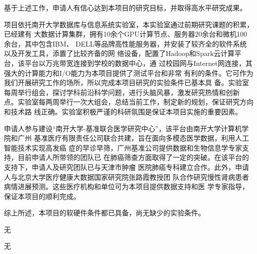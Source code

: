 \documentclass[a4paper,zihao=-4]{article}
\begin{document}
基于上述工作，申请人有信心达到本项目的研究目标，并取得高水平研究成果。


项目依托南开大学数据库与信息系统实验室，本实验室通过前期研究课题的积累，已经建有
大数据计算集群，拥有10余个GPU计算节点、服务器20余台和微机100余台，其中包含IBM、
DELL等品牌高性能服务器，并安装了较齐全的软件系统以及开发工具，添置了比较齐备的网
络设备，配置了Hadoop和Spark云计算平台，该平台以万兆带宽连接到学校的数据中心，通
过校园网与Internet网连接，其强大的计算能力和I/O能力为本项目提供了测试平台和非常
有利的条件。它可作为我们开展研究工作的场所，所以完成本项目研究的实验条件已基本具
备。实验室每周举行组会，探讨学科前沿科学问题，进行头脑风暴，激发研究热情和创新
点。实验室每两周举行一次大组会，总结当前工作，制定新的规划，保证研究方向和技术路
线正确。实验室积极严谨的科研氛围是保证本项目实施的重要因素。

申请人参与建设“南开大学-基准联合医学研究中心”，该平台由南开大学计算机学院和广州
基准医疗有限责任公司联合共建，旨在面向多模态医学数据，利用人工智能技术实现高发癌
症的早诊早筛，广州基准公司提供数据和生物信息学专家支持，目前申请人所带领的团队已
在肺癌筛查方面取得了一定的突破。在该平台的支持下，申请人及研究团队已与天津市肿瘤
医院肺癌专科建立合作。此外，申请人与北京大学医疗健康大数据国家研究院张路霞教授团
队合作研究慢性肾病患者病情进展预测。这些医疗机构和单位可为本项目提供数据支持和医
学专家指导，保证本项目的顺利完成。

综上所述，本项目的软硬件条件都已具备，尚无缺少的实验条件。


无



无


\end{document}
